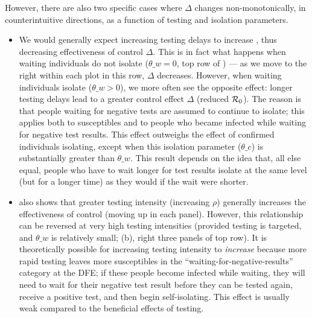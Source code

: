 However, there are also two specific cases where $\Delta$ changes non-monotonically, in counterintuitive directions, as a function of testing and isolation parameters.

\begin{itemize}
\item We would generally expect increasing testing delays to increase \Rnum, thus decreasing effectiveness of control $\Delta$. This is in fact what happens when waiting individuals do not isolate ($\theta\_w =0$, top row of ) --- as we move to the right within each plot in this row, $\Delta$ decreases.
However, when waiting individuals isolate ($\theta\_w>0$), we more often see the opposite effect: longer testing delays lead to a greater control effect $\Delta$ (reduced $\mathcal{R}_0$). The reason is that people waiting for negative tests are assumed to continue to isolate; this applies both to susceptibles and to people who became infected while waiting for negative test results. This effect outweighs the effect of confirmed individuals isolating, except when this isolation parameter ($\theta\_c$) is substantially greater than $\theta\_w$. This result depends on the idea that, all else equal, people who have to wait longer for test results isolate at the same level (but for a longer time) as they would if the wait were shorter.
\item {} also shows that greater testing intensity (increasing $\rho$) generally increases the effectiveness of control (moving up in each panel). However, this relationship can be reversed at very high testing intensities (provided testing is targeted, and $\theta\_w$ is relatively small; (b), right three panels of top row). It is theoretically possible for increasing testing intensity to \emph{increase} \Rnum because more rapid testing leaves more susceptibles in the ``waiting-for-negative-results'' category at the DFE; if these people become infected while waiting, they will need to wait for their negative test result before they can be tested again, receive a positive test, and then begin self-isolating. This effect is usually weak compared to the beneficial effects of testing.

\end{itemize}
